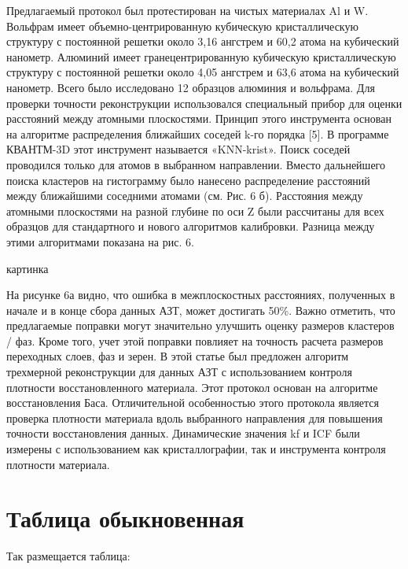 Предлагаемый протокол был протестирован на чистых материалах Al и W. Вольфрам имеет объемно-центрированную кубическую кристаллическую структуру с постоянной решетки около 3,16 ангстрем и 60,2 атома на кубический нанометр. Алюминий имеет гранецентрированную кубическую кристаллическую структуру с постоянной решетки около 4,05 ангстрем и 63,6 атома на кубический нанометр. Всего было исследовано 12 образцов алюминия и вольфрама. Для проверки точности реконструкции использовался специальный прибор для оценки расстояний между атомными плоскостями. Принцип этого инструмента основан на алгоритме распределения ближайших соседей k-го порядка [5]. В программе КВАНТМ-3D этот инструмент называется «KNN-krist». Поиск соседей проводился только для атомов в выбранном направлении. Вместо дальнейшего поиска кластеров на гистограмму было нанесено распределение расстояний между ближайшими соседними атомами (см. Рис. 6 б). Расстояния между атомными плоскостями на разной глубине по оси Z были рассчитаны для всех образцов для стандартного и нового алгоритмов калибровки. Разница между этими алгоритмами показана на рис. 6.

картинка

На рисунке 6а видно, что ошибка в межплоскостных расстояниях, полученных в начале и в конце сбора данных АЗТ, может достигать 50\%. Важно отметить, что предлагаемые поправки могут значительно улучшить оценку размеров кластеров / фаз. Кроме того, учет этой поправки повлияет на точность расчета размеров переходных слоев, фаз и зерен. 
В этой статье был предложен алгоритм трехмерной реконструкции для данных АЗТ с использованием контроля плотности восстановленного материала. Этот протокол основан на алгоритме восстановления Баса. Отличительной особенностью этого протокола является проверка плотности материала вдоль выбранного направления для повышения точности восстановления данных. Динамические значения kf и ICF были измерены с использованием как кристаллографии, так и инструмента контроля плотности материала.




\section{Таблица обыкновенная}\label{sec:ch3/sect11}

Так размещается таблица:

